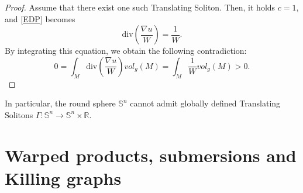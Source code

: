 \documentclass[12pt]{article}
\newcommand{\Miguel}[1]{\textcolor{miguel}{#1}}
\numberwithin{lemma}{section}
\newcommand{\R}{\mathbb{R}}
\begin{document}
\begin{proof} Assume that there exist one such Translating Soliton. Then, it holds $c=1$, and \eqref{EDP} becomes 
\[ \mathrm{div}\left(\frac{\nabla u}{W}\right)=\frac{1}{W}. \]
By integrating this equation, we obtain the following contradiction:
\[ 0 = \int_M\mathrm{div}\left(\frac{\nabla u}{W}\right) vol_g(M)= \int_M\frac{1}{W}vol_g(M)>0.\]
\end{proof} 
In particular, the round sphere $\mathbb{S}^n$ cannot admit globally defined Translating Solitons $\Gamma:\mathbb{S}^n\rightarrow\mathbb{S}^n\times\R$.



\section{Warped products, submersions and Killing graphs}\label{Warped products, submersions and Killing graphs}
\end{document}
